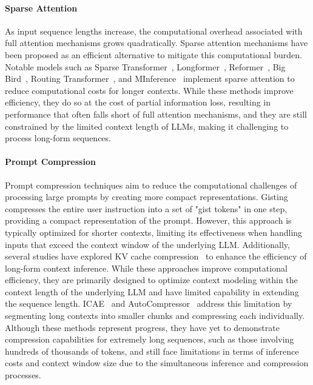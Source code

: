 \paragraph{Sparse Attention}
As input sequence lengths increase, the computational overhead associated with full attention mechanisms grows quadratically. Sparse attention mechanisms have been proposed as an efficient alternative to mitigate this computational burden. Notable models such as Sparse Transformer~\cite{sparse-transformer}, Longformer~\cite{longformer}, Reformer~\cite{reformer}, Big Bird~\cite{bigbird}, Routing Transformer~\cite{routing-transformer}, and MInference~\cite{minference} implement sparse attention to reduce computational costs for longer contexts.
While these methods improve efficiency, they do so at the cost of partial information loss, resulting in performance that often falls short of full attention mechanisms, and they are still constrained by the limited context length of LLMs, making it challenging to process long-form sequences.

\paragraph{Prompt Compression}
Prompt compression techniques aim to reduce the computational challenges of processing large prompts by creating more compact representations. Gisting~\cite{gist} compresses the entire user instruction into a set of "gist tokens" in one step, providing a compact representation of the prompt. However, this approach is typically optimized for shorter contexts, limiting its effectiveness when handling inputs that exceed the context window of the underlying LLM.
Additionally, several studies have explored 
KV cache compression~\cite{dmc, pyramidkv} to enhance the efficiency of long-form context inference. 
While these approaches improve computational efficiency, they are primarily designed to optimize context modeling within the context length of the underlying LLM and have limited capability in extending the sequence length.
ICAE~\cite{icae} and AutoCompressor~\cite{autocompressor} address this limitation by segmenting long contexts into smaller chunks and compressing each individually. Although these methods represent progress, they have yet to demonstrate compression capabilities for extremely long sequences, such as those involving hundreds of thousands of tokens, and still face limitations in terms of inference costs and context window size due to the simultaneous inference and compression processes.
